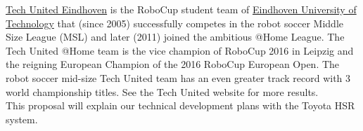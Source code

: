 \href{http://www.techunited.nl}{Tech United Eindhoven} is the RoboCup student team of \href{http://www.tue.nl}{Eindhoven University of Technology} that (since 2005) successfully competes in the robot soccer Middle Size League (MSL) and later (2011) joined the ambitious @Home League. The Tech United @Home team is the vice champion of RoboCup 2016 in Leipzig and the reigning European Champion of the 2016 RoboCup European Open. The robot soccer mid-size Tech United team has an even greater track record with 3 world championship titles. See the Tech United website for more results.
\\
This proposal will explain our technical development plans with the Toyota HSR system. 